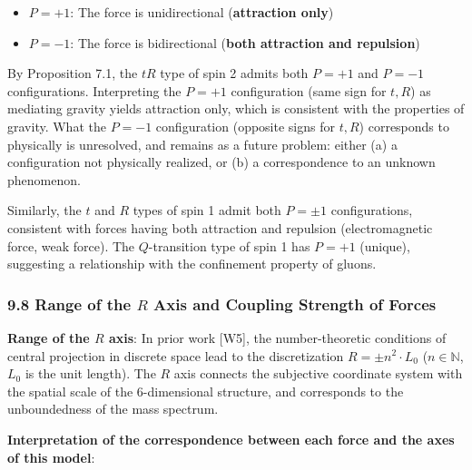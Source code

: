 \documentclass[
  a4paper,11pt]{article}
\providecommand{\tightlist}{%
  \setlength{\itemsep}{0pt}\setlength{\parskip}{0pt}}
\theoremstyle{definition}
\theoremstyle{remark}
\begin{document}
\begin{itemize}
\tightlist
\item
  \(P = +1\): The force is unidirectional (\textbf{attraction only})
\item
  \(P = -1\): The force is bidirectional (\textbf{both attraction and
  repulsion})
\end{itemize}

By Proposition 7.1, the \(tR\) type of spin 2 admits both \(P = +1\) and
\(P = -1\) configurations. Interpreting the \(P = +1\) configuration
(same sign for \(t, R\)) as mediating gravity yields attraction only,
which is consistent with the properties of gravity. What the \(P = -1\)
configuration (opposite signs for \(t, R\)) corresponds to physically is
unresolved, and remains as a future problem: either (a) a configuration
not physically realized, or (b) a correspondence to an unknown
phenomenon.

Similarly, the \(t\) and \(R\) types of spin 1 admit both \(P = \pm 1\)
configurations, consistent with forces having both attraction and
repulsion (electromagnetic force, weak force). The \(Q\)-transition type
of spin 1 has \(P = +1\) (unique), suggesting a relationship with the
confinement property of gluons.

\subsubsection{\texorpdfstring{9.8 Range of the \(R\) Axis and Coupling
Strength of
Forces}{9.8 Range of the R Axis and Coupling Strength of Forces}}\label{range-of-the-r-axis-and-coupling-strength-of-forces}

\textbf{Range of the \(R\) axis}: In prior work {[}W5{]}, the
number-theoretic conditions of central projection in discrete space lead
to the discretization \(R = \pm n^2 \cdot L_0\) (\(n \in \mathbb{N}\),
\(L_0\) is the unit length). The \(R\) axis connects the subjective
coordinate system with the spatial scale of the 6-dimensional structure,
and corresponds to the unboundedness of the mass spectrum.

\textbf{Interpretation of the correspondence between each force and the
axes of this model}:
\end{document}
